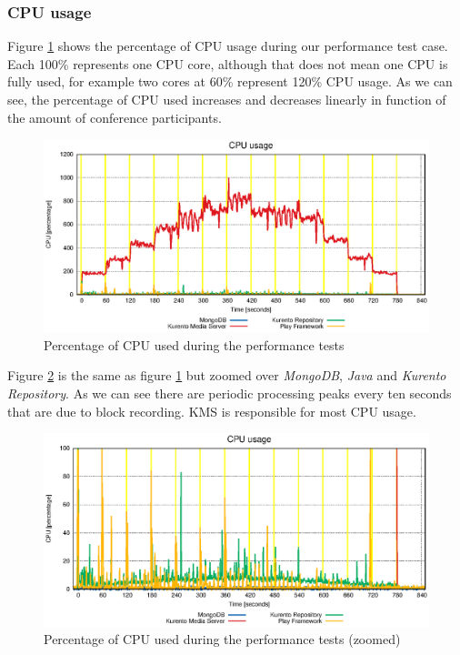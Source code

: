 \subsubsection{CPU usage}


Figure \ref{fig:test_full_features_cpu} shows the percentage of \ac{CPU} usage during our performance test case. Each 100\% represents one \ac{CPU} core, although that does not mean one \ac{CPU} is fully used, for example two cores at 60\% represent 120\% \ac{CPU} usage. As we can see, the percentage of \ac{CPU} used increases and decreases linearly in function of the amount of conference participants. 

\begin{figure}
  \centering
  \includegraphics[width=\textwidth]{stats/test_full_features_cpu.eps}
  \caption{Percentage of CPU used during the performance tests}
  \label{fig:test_full_features_cpu}
\end{figure}

Figure \ref{fig:test_full_features_cpu_zoom} is the same as figure \ref{fig:test_full_features_cpu} but zoomed over \emph{MongoDB}, \emph{Java} and \emph{Kurento Repository}. As we can see there are periodic processing peaks every ten seconds that are due to block recording. \ac{KMS} is responsible for most \ac{CPU} usage.

\begin{figure}
  \centering
  \includegraphics[width=\textwidth]{stats/test_full_features_cpu_zoom.eps}
  \caption{Percentage of CPU used during the performance tests (zoomed)}
  \label{fig:test_full_features_cpu_zoom}
\end{figure}


